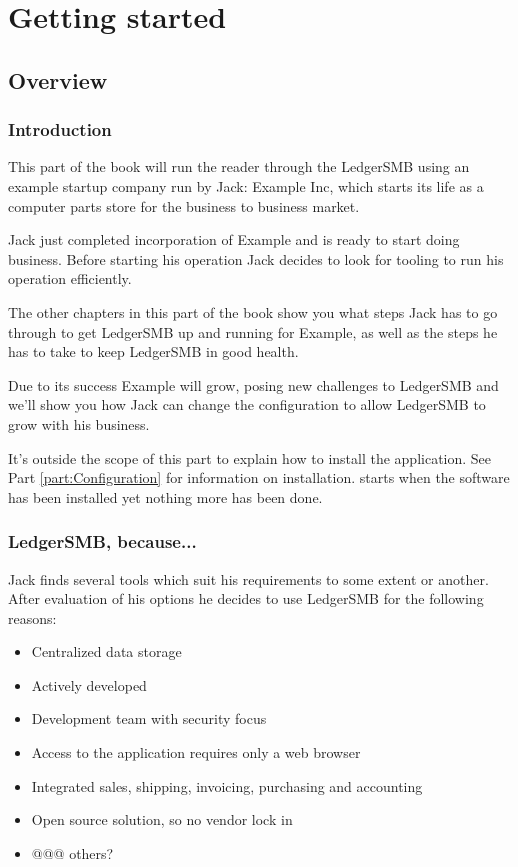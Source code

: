 

\part{Getting started}
\label{part:GettingStarted}

\chapter{Overview}

\section{Introduction}

This part of the book will run the reader through the LedgerSMB using an example
startup company run by Jack: Example Inc, which starts its life as a computer parts
store for the business to business market.

Jack just completed incorporation of Example and is ready to start doing business.
Before starting his operation Jack decides to look for tooling to run his operation
efficiently.

The other chapters in this part of the book show you what steps Jack has to go through
to get LedgerSMB up and running for Example, as well as the steps he has to take to
keep LedgerSMB in good health.

Due to its success Example will grow, posing new challenges to LedgerSMB and we'll show
you how Jack can change the configuration to allow LedgerSMB to grow with his business.

It's outside the scope of this part to explain how to install the application. See
Part \ref{part:Configuration} for information on installation. 
starts when the software has been installed yet nothing more has been done.

\section{LedgerSMB, because...}

Jack finds several tools which suit his requirements to some extent or another.
After evaluation of his options he decides to use LedgerSMB for the following reasons:

\begin{itemize}
\item Centralized data storage
\item Actively developed
\item Development team with security focus
\item Access to the application requires only a web browser
\item Integrated sales, shipping, invoicing, purchasing and accounting
\item Open source solution, so no vendor lock in
\item @@@ others?
\end{itemize}

